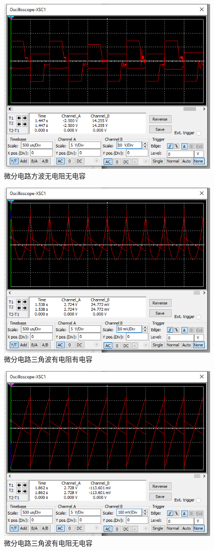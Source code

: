 \documentclass{ctexart}
\begin{document}
\begin{figure}[H]
  \centering
  \includegraphics[width=0.75\linewidth]{电路设计/微分电路/微分电路方波无电阻无电容.png}
  \caption{微分电路方波无电阻无电容}
\end{figure}

\begin{figure}[H]
  \centering
  \includegraphics[width=0.75\linewidth]{电路设计/微分电路/微分电路三角波有电阻有电容.png}
  \caption{微分电路三角波有电阻有电容}
\end{figure}

\begin{figure}[H]
  \centering
  \includegraphics[width=0.75\linewidth]{电路设计/微分电路/微分电路三角波有电阻无电容.png}
  \caption{微分电路三角波有电阻无电容}
\end{figure}
\end{document}
